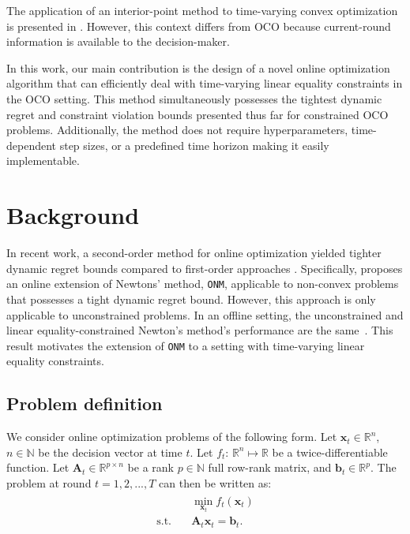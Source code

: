 \documentclass[journal,twoside,web]{ieeecolor}
\newcommand{\xx}{\mathbf{x}}
\newcommand{\bb}{\mathbf{b}}
\renewcommand{\AA}{\mathbf{A}}
\begin{document}
The application of an interior-point method to time-varying convex optimization is presented in \cite{InteriorOnline}. However, this context differs from OCO because current-round information is available to the decision-maker.


{In this work, our main contribution is the design of a novel online optimization algorithm that can efficiently deal with time-varying linear equality constraints in the OCO setting. This method simultaneously possesses the tightest dynamic regret and constraint violation bounds presented thus far for constrained OCO problems. Additionally, the method does not require hyperparameters, time-dependent step sizes, or a predefined time horizon making it easily implementable.}




\section{Background}

In recent work, a second-order method for online optimization yielded tighter dynamic regret bounds compared to first-order approaches \cite{OnlineNewton}. Specifically, \cite{OnlineNewton} proposes an online extension of Newtons' method, \texttt{ONM}, applicable to non-convex problems that possesses a tight dynamic regret bound. However, this approach is only applicable to unconstrained problems. In an offline setting, the unconstrained and linear equality-constrained Newton's method's performance are the same~\cite{boyd, renegar}. This result motivates the extension of \texttt{ONM} to a setting with time-varying linear equality constraints.

\subsection{Problem definition}

We consider online optimization problems of the following form. Let $\xx_t\in \mathbb{R}^n$, $n\in\mathbb{N}$ be the decision vector at time $t$. Let $f_t$: $\mathbb{R}^n\mapsto \mathbb{R}$ be a twice-differentiable function. Let $\mathbf{A}_t \in \mathbb{R}^{p\times n}$ be a rank $p\in\mathbb{N}$ { full row-rank matrix}, and $\bb_t \in \mathbb{R}^p$. The problem at round $t=1,2,...,T$ can then be written as:
\begin{align}\label{BaseProblem}
\begin{split}
    &\min\limits_{\xx_t} f_t(\xx_t)\\
    \text{s.t.}\quad& \AA_t\xx_t=\bb_t.
\end{split}
\end{align}
\end{document}
